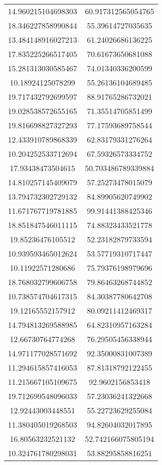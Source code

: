 \begin{table}
\begin{tabular}{cc}
14.960215104698303 & 60.917312565054765 \\
18.346227858990844 & 55.39614727035635 \\
13.484148916027213 & 61.24026686136225 \\
17.835225266517405 & 70.61673650681088 \\
15.281313030585467 & 74.01340336200599 \\
10.18924125078299 & 55.26136104689485 \\
19.717432792699597 & 88.91765286732021 \\
19.028538572655165 & 71.35514705851499 \\
19.816698827327293 & 77.17593689758544 \\
12.433910789868339 & 62.83179331276264 \\
10.204252533712694 & 67.59326573334752 \\
17.93438473504615 & 50.703486789339884 \\
14.810257145409079 & 57.25273478015079 \\
13.794732302729132 & 84.89905620749902 \\
11.671767719781885 & 99.91441388425346 \\
18.851847546011115 & 74.88323433521778 \\
19.85236476105512 & 52.23182879733594 \\
10.939593465012624 & 53.57719310717447 \\
10.11922571280686 & 75.79376198979696 \\
18.768032799606758 & 79.86463268744852 \\
10.738574704617315 & 84.30387780642708 \\
19.12165552157912 & 80.09211412469317 \\
14.794813269588985 & 64.82310957163284 \\
12.66730764774268 & 76.29505456338944 \\
14.971177028571692 & 92.35000831007389 \\
11.294615857416053 & 87.81318792122455 \\
11.215667105109675 & 92.9602156853418 \\
19.712699548096033 & 57.23036241322668 \\
12.92443003448551 & 55.22723629255084 \\
11.380405019268503 & 94.82604032017895 \\
16.80563232521132 & 52.742166075805194 \\
10.324761780298031 & 53.88295858816251 \\

\end{tabular}
\end{table}
